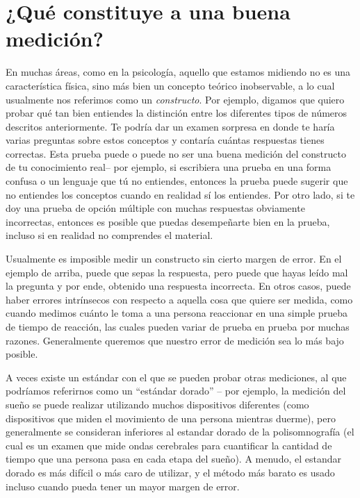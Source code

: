 \documentclass[
  12pt,
]{book}
\begin{document}
\hypertarget{quuxe9-constituye-a-una-buena-mediciuxf3n}{%
\section{¿Qué constituye a una buena medición?}\label{quuxe9-constituye-a-una-buena-mediciuxf3n}}

En muchas áreas, como en la psicología, aquello que estamos midiendo no es una característica física, sino más bien un concepto teórico inobservable, a lo cual usualmente nos referimos como un \emph{constructo}. Por ejemplo, digamos que quiero probar qué tan bien entiendes la distinción entre los diferentes tipos de números descritos anteriormente. Te podría dar un examen sorpresa en donde te haría varias preguntas sobre estos conceptos y contaría cuántas respuestas tienes correctas. Esta prueba puede o puede no ser una buena medición del constructo de tu conocimiento real-- por ejemplo, si escribiera una prueba en una forma confusa o un lenguaje que tú no entiendes, entonces la prueba puede sugerir que no entiendes los conceptos cuando en realidad sí los entiendes. Por otro lado, si te doy una prueba de opción múltiple con muchas respuestas obviamente incorrectas, entonces es posible que puedas desempeñarte bien en la prueba, incluso si en realidad no comprendes el material.

Usualmente es imposible medir un constructo sin cierto margen de error. En el ejemplo de arriba, puede que sepas la respuesta, pero puede que hayas leído mal la pregunta y por ende, obtenido una respuesta incorrecta. En otros casos, puede haber errores intrínsecos con respecto a aquella cosa que quiere ser medida, como cuando medimos cuánto le toma a una persona reaccionar en una simple prueba de tiempo de reacción, las cuales pueden variar de prueba en prueba por muchas razones. Generalmente queremos que nuestro error de medición sea lo más bajo posible.

A veces existe un estándar con el que se pueden probar otras mediciones, al que podríamos referirnos como un ``estándar dorado'' -- por ejemplo, la medición del sueño se puede realizar utilizando muchos dispositivos diferentes (como dispositivos que miden el movimiento de una persona mientras duerme), pero generalmente se consideran inferiores al estandar dorado de la polisomnografía (el cual es un examen que mide ondas cerebrales para cuantificar la cantidad de tiempo que una persona pasa en cada etapa del sueño). A menudo, el estandar dorado es más difícil o más caro de utilizar, y el método más barato es usado incluso cuando pueda tener un mayor margen de error.
\end{document}
